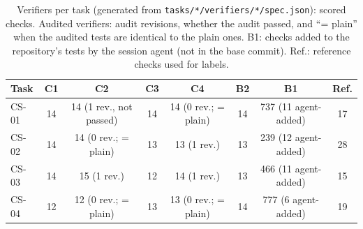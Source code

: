\begin{table}[t]\centering\scriptsize
\caption{Verifiers per task (generated from \texttt{tasks/*/verifiers/*/spec.json}): scored checks. Audited verifiers: audit revisions, whether the audit passed, and ``= plain'' when the audited tests are identical to the plain ones. B1: checks added to the repository's tests by the session agent (not in the base commit). Ref.: reference checks used for labels.}\label{tab:verifiers}
\begin{tabular}{lccccccc}\toprule Task & C1 & C2 & C3 & C4 & B2 & B1 & Ref. \\\midrule
CS-01 & 14 & 14 (1 rev., not passed) & 14 & 14 (0 rev.; = plain) & 14 & 737 (11 agent-added) & 17 \\
CS-02 & 14 & 14 (0 rev.; = plain) & 13 & 13 (1 rev.) & 13 & 239 (12 agent-added) & 28 \\
CS-03 & 14 & 15 (1 rev.) & 12 & 14 (1 rev.) & 13 & 466 (11 agent-added) & 15 \\
CS-04 & 12 & 12 (0 rev.; = plain) & 13 & 13 (0 rev.; = plain) & 14 & 777 (6 agent-added) & 19 \\
\bottomrule\end{tabular}\end{table}
